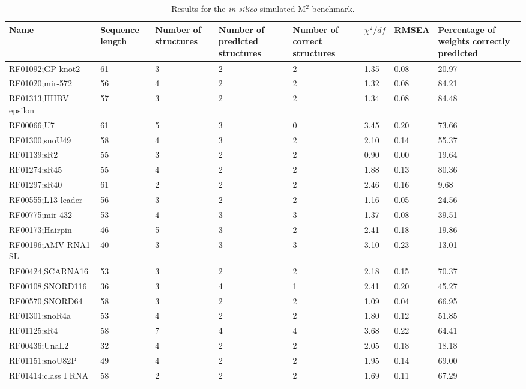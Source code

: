 \documentclass[12pt]{article}
\begin{document}
\begin{table}[htbp]
\caption{Results for the \textit{in silico} simulated M$^2$ benchmark. }
\begin{tabular}{|l|p{0.5cm}|p{2cm}|p{2cm}|p{2cm}|p{2cm}|p{2cm}|p{2cm}|}
\hline
Name & \multicolumn{1}{p{1.5cm}|}{Sequence length} & \multicolumn{1}{p{2cm}|}{Number of structures} & \multicolumn{1}{p{2cm}|}{Number of predicted structures} & \multicolumn{1}{p{2cm}|}{Number of correct structures} & \multicolumn{1}{p{2cm}|}{$\chi^2/df$} & \multicolumn{1}{p{2cm}|}{RMSEA} & \multicolumn{1}{p{2cm}|}{Percentage of weights correctly predicted} \\ \hline
RF01092;GP knot2 & 61 & 3 & 2 & 2 & 1.35 & 0.08 & 20.97 \\ \hline
RF01020;mir-572 & 56 & 4 & 2 & 2 & 1.32 & 0.08 & 84.21 \\ \hline
RF01313;HHBV epsilon & 57 & 3 & 2 & 2 & 1.34 & 0.08 & 84.48 \\ \hline
RF00066;U7 & 61 & 5 & 3 & 0 & 3.45 & 0.20 & 73.66 \\ \hline
RF01300;snoU49 & 58 & 4 & 3 & 2 & 2.10 & 0.14 & 55.37 \\ \hline
RF01139;sR2 & 55 & 3 & 2 & 2 & 0.90 & 0.00 & 19.64 \\ \hline
RF01274;sR45 & 55 & 4 & 2 & 2 & 1.88 & 0.13 & 80.36 \\ \hline
RF01297;sR40 & 61 & 2 & 2 & 2 & 2.46 & 0.16 & 9.68 \\ \hline
RF00555;L13 leader & 56 & 3 & 2 & 2 & 1.16 & 0.05 & 24.56 \\ \hline
RF00775;mir-432 & 53 & 4 & 3 & 3 & 1.37 & 0.08 & 39.51 \\ \hline
RF00173;Hairpin & 46 & 5 & 3 & 2 & 2.41 & 0.18 & 19.86 \\ \hline
RF00196;AMV RNA1 SL & 40 & 3 & 3 & 3 & 3.10 & 0.23 & 13.01 \\ \hline
RF00424;SCARNA16 & 53 & 3 & 2 & 2 & 2.18 & 0.15 & 70.37 \\ \hline
RF00108;SNORD116 & 36 & 3 & 4 & 1 & 2.41 & 0.20 & 45.27 \\ \hline
RF00570;SNORD64 & 58 & 3 & 2 & 2 & 1.09 & 0.04 & 66.95 \\ \hline
RF01301;snoR4a & 53 & 4 & 2 & 2 & 1.80 & 0.12 & 51.85 \\ \hline
RF01125;sR4 & 58 & 7 & 4 & 4 & 3.68 & 0.22 & 64.41 \\ \hline
RF00436;UnaL2 & 32 & 4 & 2 & 2 & 2.05 & 0.18 & 18.18 \\ \hline
RF01151;snoU82P & 49 & 4 & 2 & 2 & 1.95 & 0.14 & 69.00 \\ \hline
RF01414;class I RNA & 58 & 2 & 2 & 2 & 1.69 & 0.11 & 67.29 \\ \hline
\end{tabular}
\label{insilicobenchmark}
\end{table}
\end{document}
